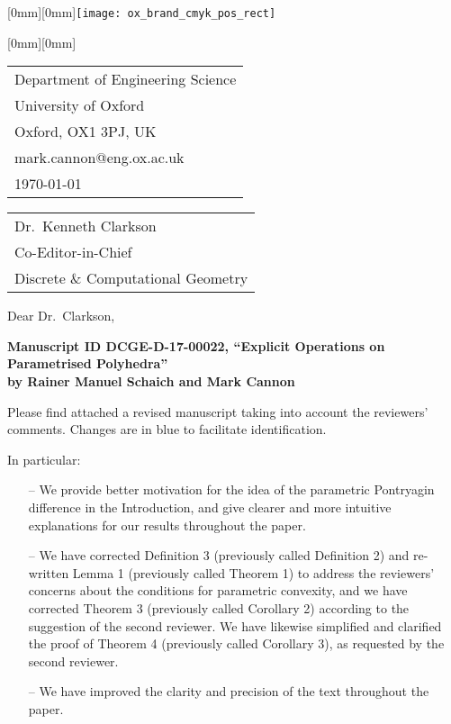 \documentclass[11pt, a4paper]{article}
\begin{document}
\raisebox{-\height}[0mm][0mm]{\texttt{[image: ox\_brand\_cmyk\_pos\_rect]}}

\hspace{105mm}%
\raisebox{-7.7mm}[0mm][0mm]{\begin{tabular}{@{}l@{}}
Department of Engineering Science\\
University of Oxford\\
Oxford, OX1 3PJ, UK\\
{mark.cannon@eng.ox.ac.uk}
\\
\today\rule{0pt}{25pt}
\end{tabular}}

\vspace{30mm}

\begin{tabular}{@{}l@{}} 
Dr.~Kenneth Clarkson\\
Co-Editor-in-Chief\\
Discrete \& Computational Geometry
\end{tabular}

\vspace{15mm}

\noindent Dear Dr.\ Clarkson,

\textbf{Manuscript ID DCGE-D-17-00022, ``Explicit Operations on Parametrised Polyhedra''\\
by Rainer Manuel Schaich and Mark Cannon}
 
Please find attached a revised manuscript taking into account the reviewers' comments. Changes are in blue to facilitate identification.

In particular:

\begin{itemize}
\item[--] We provide better motivation for the idea of the parametric Pontryagin difference in the Introduction, and give clearer and more intuitive explanations for our results throughout the paper.
\item[--] We have corrected Definition 3 (previously called Definition 2) and re-written Lemma 1 (previously called Theorem 1) to address the reviewers' concerns about the conditions for parametric convexity, and we have corrected Theorem 3 (previously called Corollary 2) according to the suggestion of the second reviewer. We have likewise simplified and clarified the proof of Theorem 4 (previously called Corollary 3), as requested by the second reviewer.
\item[--] We have improved the clarity and precision of the text throughout the paper.
\end{itemize}
\end{document}
